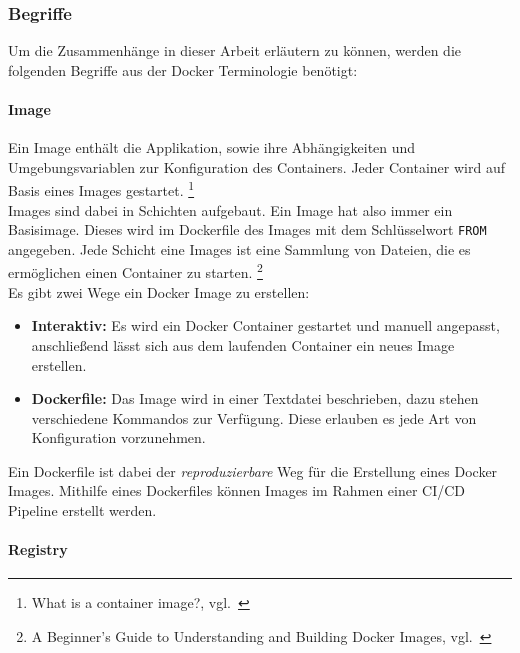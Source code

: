 \subsubsection{Begriffe}\label{containers_begriffe}

Um die Zusammenhänge in dieser Arbeit erläutern zu können, werden die folgenden Begriffe aus der Docker Terminologie benötigt:

\paragraph{Image}

Ein Image enthält die Applikation, sowie ihre Abhängigkeiten und Umgebungsvariablen zur Konfiguration des Containers.
Jeder Container wird auf Basis eines Images gestartet.
\footnote{What is a container image?, vgl.~\cite{DOCKER_CONTAINER_IMAGE}} \\

Images sind dabei in Schichten aufgebaut.
Ein Image hat also immer ein Basisimage.
Dieses wird im Dockerfile des Images mit dem Schlüsselwort \texttt{FROM} angegeben.
Jede Schicht eine Images ist eine Sammlung von Dateien, die es ermöglichen einen Container zu starten.
\footnote{A Beginner’s Guide to Understanding and Building Docker Images, vgl.~\cite{JFROG_CONTAINER_IMAGES}} \\

Es gibt zwei Wege ein Docker Image zu erstellen:

\begin{itemize}
    \item \textbf{Interaktiv:}
    Es wird ein Docker Container gestartet und manuell angepasst, anschließend lässt sich aus dem laufenden Container ein neues Image erstellen.

    \item \textbf{Dockerfile:}
    Das Image wird in einer Textdatei beschrieben, dazu stehen verschiedene Kommandos zur Verfügung.
    Diese erlauben es jede Art von Konfiguration vorzunehmen.
\end{itemize}

Ein Dockerfile ist dabei der \textit{reproduzierbare} Weg für die Erstellung eines Docker Images.
Mithilfe eines Dockerfiles können Images im Rahmen einer CI/CD Pipeline erstellt werden.

\paragraph{Registry}

